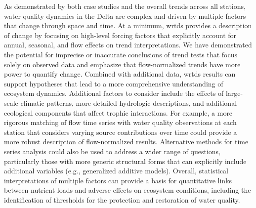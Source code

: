 \documentclass[journal = esthag, manuscript = article]{achemso}\usepackage[]{graphicx}\usepackage[]{color}
\begin{document}
As demonstrated by both case studies and the overall trends across all stations, water quality dynamics in the Delta are complex and driven by multiple factors that change through space and time.  At a minimum, \ac{wrtds} provides a description of change by focusing on high-level forcing factors that explicitly account for annual, seasonal, and flow effects on trend interpretations.  We have demonstrated the potential for imprecise or inaccurate conclusions of trend tests that focus solely on observed data and emphasize that flow-normalized trends have more power to quantify change.  Combined with additional data, \ac{wrtds} results can support hypotheses that lead to a more comprehensive understanding of ecosystem dynamics. Additional factors to consider include the effects of large-scale climatic patterns, more detailed hydrologic descriptions, and additional ecological components that affect trophic interactions.  For example, a more rigorous matching of flow time series with water quality observations at each station that considers varying source contributions over time could provide a more robust description of flow-normalized results.  Alternative methods for time series analysis could also be used to address a wider range of questions, particularly those with more generic structural forms that can explicitly include additional variables (e.g., generalized additive models).\cite{Beck17}  Overall, statistical interpretations of multiple factors can provide a basis for quantitative links between nutrient loads and adverse effects on ecosystem conditions, including the identification of thresholds for the protection and restoration of water quality. 

\begin{singlespace}

\end{singlespace}
\clearpage

\end{document}
